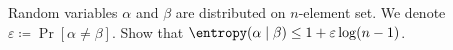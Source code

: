 Random variables $\alpha$ and $\beta$ are distributed on $n$-element set. We denote $\varepsilon
\coloneqq \Pr[\alpha \neq \beta]$. Show that $\entropy(\alpha \mid \beta) \le 1 + \varepsilon \log (n -
1)$.